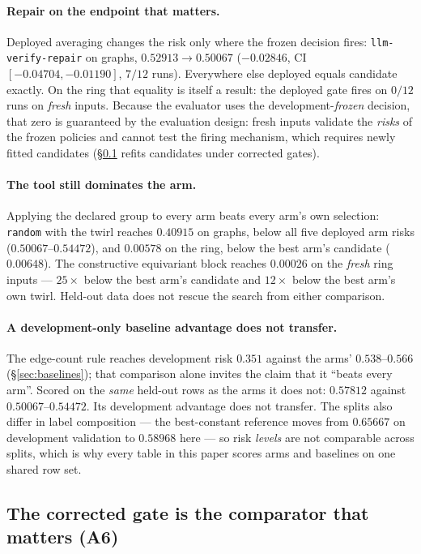 \documentclass[11pt]{article}
\begin{document}
\paragraph{Repair on the endpoint that matters.} Deployed averaging changes the risk only
where the frozen decision fires: \texttt{llm-verify-repair} on graphs, $0.52913 \to 0.50067$
($-0.02846$, CI $[-0.04704, -0.01190]$, $7/12$ runs). Everywhere else deployed equals
candidate exactly. On the ring that equality is itself a result: the deployed gate fires on
$0/12$ runs on \emph{fresh} inputs. Because the evaluator uses the development-\emph{frozen}
decision, that zero is guaranteed by the evaluation design: fresh inputs validate the
\emph{risks} of the frozen policies and cannot test the firing mechanism, which requires
newly fitted candidates (\S\ref{sec:corrected} refits candidates under corrected gates).

\paragraph{The tool still dominates the arm.} Applying the declared group to every arm beats
every arm's own selection: \texttt{random} with the twirl reaches $0.40915$ on graphs, below
all five deployed arm risks ($0.50067$--$0.54472$), and $0.00578$ on the ring, below the best
arm's candidate ($0.00648$). The constructive equivariant block reaches $0.00026$ on the
\emph{fresh} ring inputs --- $25\times$ below the best arm's candidate and $12\times$ below the
best arm's own twirl. Held-out data does not rescue the search from either comparison.

\paragraph{A development-only baseline advantage does not transfer.} The edge-count rule
reaches development risk $0.351$ against the arms' $0.538$--$0.566$
(\S\ref{sec:baselines}); that comparison alone invites the claim that it ``beats every arm''.
Scored on the \emph{same} held-out rows as the arms it does not: $0.57812$ against
$0.50067$--$0.54472$. Its development advantage does not transfer. The splits also differ in
label composition --- the best-constant reference moves from $0.65667$ on development
validation to $0.58968$ here --- so risk \emph{levels} are not comparable across splits, which
is why every table in this paper scores arms and baselines on one shared row set.

\subsection{The corrected gate is the comparator that matters (A6)}
\label{sec:corrected}
\end{document}
